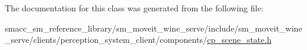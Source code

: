 The documentation for this class was generated from the following file\+:\begin{DoxyCompactItemize}
\item 
smacc\+\_\+sm\+\_\+reference\+\_\+library/sm\+\_\+moveit\+\_\+wine\+\_\+serve/include/sm\+\_\+moveit\+\_\+wine\+\_\+serve/clients/perception\+\_\+system\+\_\+client/components/\hyperlink{sm__moveit__wine__serve_2include_2sm__moveit__wine__serve_2clients_2perception__system__client_2components_2cp__scene__state_8h}{cp\+\_\+scene\+\_\+state.\+h}\end{DoxyCompactItemize}
